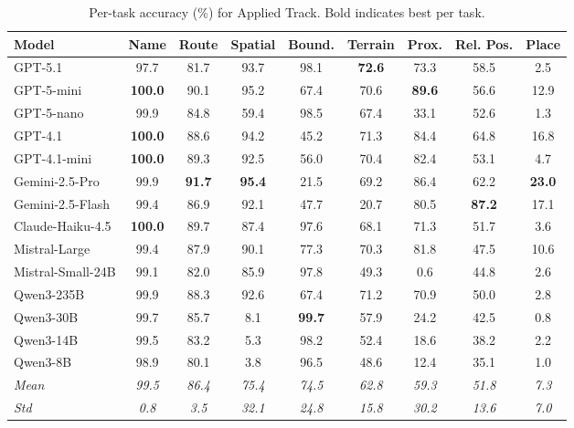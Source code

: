 \begin{table}[htbp]
\centering
\caption{Per-task accuracy (\%) for Applied Track. Bold indicates best per task.}
\label{tab:per_task_applied}
\small
\begin{tabular}{lcccccccc}
\toprule
\textbf{Model} & \textbf{Name} & \textbf{Route} & \textbf{Spatial} & \textbf{Bound.} & \textbf{Terrain} & \textbf{Prox.} & \textbf{Rel. Pos.} & \textbf{Place} \\
\midrule
GPT-5.1 & 97.7 & 81.7 & 93.7 & 98.1 & \textbf{72.6} & 73.3 & 58.5 & 2.5 \\
GPT-5-mini & \textbf{100.0} & 90.1 & 95.2 & 67.4 & 70.6 & \textbf{89.6} & 56.6 & 12.9 \\
GPT-5-nano & 99.9 & 84.8 & 59.4 & 98.5 & 67.4 & 33.1 & 52.6 & 1.3 \\
GPT-4.1 & \textbf{100.0} & 88.6 & 94.2 & 45.2 & 71.3 & 84.4 & 64.8 & 16.8 \\
GPT-4.1-mini & \textbf{100.0} & 89.3 & 92.5 & 56.0 & 70.4 & 82.4 & 53.1 & 4.7 \\
\midrule
Gemini-2.5-Pro & 99.9 & \textbf{91.7} & \textbf{95.4} & 21.5 & 69.2 & 86.4 & 62.2 & \textbf{23.0} \\
Gemini-2.5-Flash & 99.4 & 86.9 & 92.1 & 47.7 & 20.7 & 80.5 & \textbf{87.2} & 17.1 \\
\midrule
Claude-Haiku-4.5 & \textbf{100.0} & 89.7 & 87.4 & 97.6 & 68.1 & 71.3 & 51.7 & 3.6 \\
\midrule
Mistral-Large & 99.4 & 87.9 & 90.1 & 77.3 & 70.3 & 81.8 & 47.5 & 10.6 \\
Mistral-Small-24B & 99.1 & 82.0 & 85.9 & 97.8 & 49.3 & 0.6 & 44.8 & 2.6 \\
\midrule
Qwen3-235B & 99.9 & 88.3 & 92.6 & 67.4 & 71.2 & 70.9 & 50.0 & 2.8 \\
Qwen3-30B & 99.7 & 85.7 & 8.1 & \textbf{99.7} & 57.9 & 24.2 & 42.5 & 0.8 \\
Qwen3-14B & 99.5 & 83.2 & 5.3 & 98.2 & 52.4 & 18.6 & 38.2 & 2.2 \\
Qwen3-8B & 98.9 & 80.1 & 3.8 & 96.5 & 48.6 & 12.4 & 35.1 & 1.0 \\
\midrule
\textit{Mean} & \textit{99.5} & \textit{86.4} & \textit{75.4} & \textit{74.5} & \textit{62.8} & \textit{59.3} & \textit{51.8} & \textit{7.3} \\
\textit{Std} & \textit{0.8} & \textit{3.5} & \textit{32.1} & \textit{24.8} & \textit{15.8} & \textit{30.2} & \textit{13.6} & \textit{7.0} \\
\bottomrule
\end{tabular}
\end{table}


